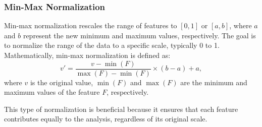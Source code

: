 \subsubsection{Min-Max Normalization}\label{subsec:min-max}
Min-max normalization rescales the range of features to $[0, 1]$ or $[a, b]$, where $a$ and $b$ represent the new minimum and maximum values, respectively.
The goal is to normalize the range of the data to a specific scale, typically 0 to 1.
Mathematically, min-max normalization is defined as:
$$
	v' = \frac{v - \min(F)}{\max(F) - \min(F)} \times (b - a) + a,
$$
where $v$ is the original value, $\min(F)$ and $\max(F)$ are the minimum and maximum values of the feature $F$, respectively.

This type of normalization is beneficial because it ensures that each feature contributes equally to the analysis, regardless of its original scale.